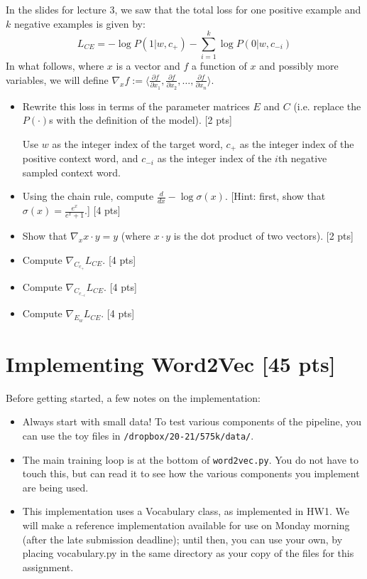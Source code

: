 \documentclass[11pt]{article}
\begin{document}
\vspace{2em}
  In the slides for lecture 3, we saw that the total loss for one positive example and $k$ negative examples is given by:
$$ L_{CE} = -\log P(1 | w, c_+) - \sum_{i=1}^k \log P(0 | w, c_{-i})$$
In what follows, where $x$ is a vector and $f$ a function of $x$ and possibly more variables, we will define $\nabla_x f := \langle \frac{\partial f}{\partial x_1} , \frac{\partial f}{\partial x_2}, \dots , \frac{\partial f}{\partial x_n} \rangle$.
\begin{itemize}
  \item Rewrite this loss in terms of the parameter matrices $E$ and $C$ (i.e. replace the $P(\cdot)$s with the definition of the model). [2 pts]

        Use $w$ as the integer index of the target word, $c_+$ as the integer index of the positive context word, and $c_{-i}$ as the integer index of the $i$th negative sampled context word.
  \item Using the chain rule, compute $\frac{d}{dx} -\log\sigma(x)$.  [Hint: first, show that $\sigma(x) = \frac{e^x}{e^x+1}$.] [4 pts]
  \item Show that $\nabla_x x \cdot y = y$ (where $x \cdot y$ is the dot product of two vectors). [2 pts]
  \item Compute $\nabla_{C_{c_+}} L_{CE}$. [4 pts]
  \item Compute $\nabla_{C_{c_{-i}}} L_{CE}$. [4 pts]
  \item Compute $\nabla_{E_w} L_{CE}$. [4 pts]
\end{itemize}


\section{Implementing Word2Vec [45 pts]}

Before getting started, a few notes on the implementation:
\begin{itemize}
  \item Always start with small data!  To test various components of the pipeline, you can use the toy files in \texttt{/dropbox/20-21/575k/data/}.
  \item The main training loop is at the bottom of \texttt{word2vec.py}.  You do not have to touch this, but can read it to see how the various components you implement are being used.
  \item This implementation uses a Vocabulary class, as implemented in HW1.  We will make a reference implementation available for use on Monday morning (after the late submission deadline); until then, you can use your own, by placing vocabulary.py in the same directory as your copy of the files for this assignment.
\end{itemize}
\end{document}
